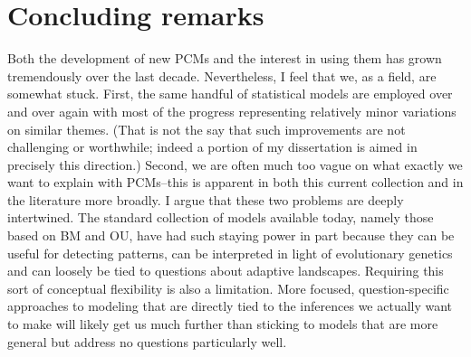 \section{Concluding remarks}

Both the development of new PCMs and the interest in using them has grown tremendously over the last decade.  Nevertheless, I feel that we, as a field, are somewhat stuck. First, the same handful of statistical models are employed over and over again with most of the progress representing relatively minor variations on similar themes. (That is not the say that such improvements are not challenging or worthwhile; indeed a portion of my dissertation is aimed in precisely this direction.) Second, we are often much too vague on what exactly we want to explain with PCMs--this is apparent in both this current collection and in the literature more broadly. I argue that these two problems are deeply intertwined. The standard collection of models available today, namely those based on BM and OU, have had such staying power in part because they can be useful for detecting patterns, can be interpreted in light of evolutionary genetics and can loosely be tied to questions about adaptive landscapes. Requiring this sort of conceptual flexibility is also a limitation. More focused, question-specific approaches to modeling that are directly tied to the inferences we actually want to make will likely get us much further than sticking to models that are more general but address no questions particularly well.

 

   

